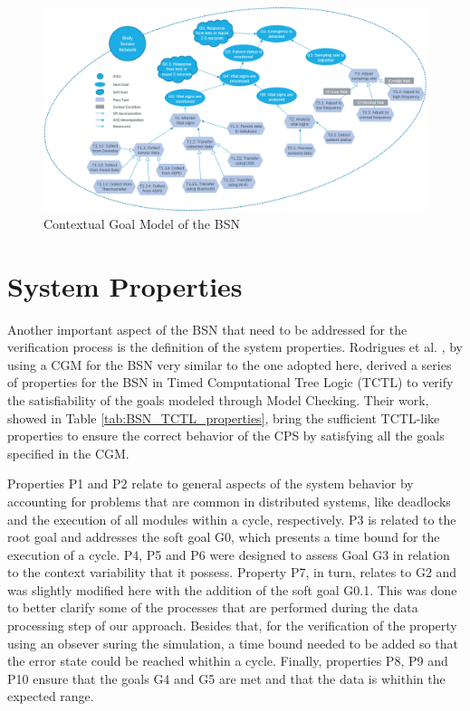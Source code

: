 \begin{figure}[!h]
	\centering
	\includegraphics[width=1\textwidth, keepaspectratio]{img/cgm_bsn.png}
	\caption{Contextual Goal Model of the BSN}
	\label{fig:BSN-CGM}
\end{figure}

\section{System Properties}

Another important aspect of the BSN that need to be addressed for the verification process is the definition of the system properties. Rodrigues et al. \cite{seams2018}, by using a CGM for the BSN very similar to the one adopted here, derived a series of properties for the BSN in Timed Computational Tree Logic (TCTL) \cite{henzinger1994symbolic} to verify the satisfiability of the goals modeled through Model Checking. Their work, showed in Table \ref{tab:BSN_TCTL_properties}, bring the sufficient TCTL-like properties to ensure the correct behavior of the CPS by satisfying all the goals specified in the CGM. 

Properties P1 and P2 relate to general aspects of the system behavior by accounting for problems that are common in distributed systems, like deadlocks and the execution of all modules within a cycle, respectively. P3 is related to the root goal and addresses the soft goal G0, which presents a time bound for the execution of a cycle.  P4, P5 and P6 were designed to assess Goal G3 in relation to the context variability that it possess. Property P7, in turn, relates to G2 and was slightly modified here with the addition of the soft goal G0.1. This was done to better clarify some of the processes that are performed during the data processing step of our approach. Besides that, for the verification of the property using an obsever suring the simulation, a time bound needed to be added so that the error state could be reached whithin a cycle. Finally, properties P8, P9 and P10 ensure that the goals G4 and G5 are met and that the data is whithin the expected range.


